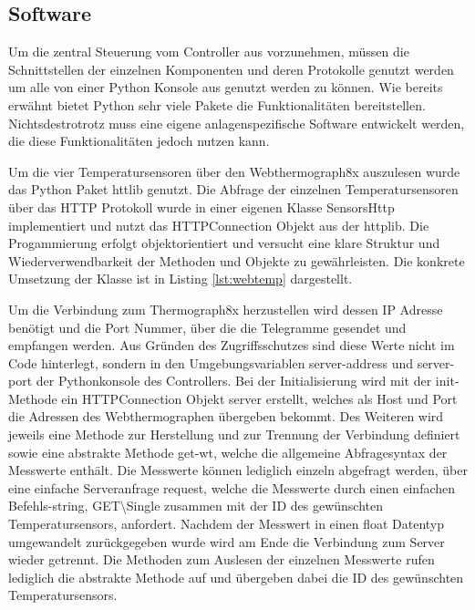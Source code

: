 \subsection{Software}

Um die zentral Steuerung vom Controller aus vorzunehmen, müssen die Schnittstellen der einzelnen Komponenten und deren Protokolle genutzt werden um alle von einer Python Konsole aus genutzt werden zu können. Wie bereits erwähnt bietet Python sehr viele Pakete die Funktionalitäten bereitstellen. Nichtsdestrotrotz muss eine eigene anlagenspezifische Software entwickelt werden, die diese Funktionalitäten jedoch nutzen kann.

Um die vier Temperatursensoren über den Webthermograph8x auszulesen wurde das Python Paket httlib genutzt. Die Abfrage der einzelnen Temperatursensoren über das HTTP Protokoll wurde in einer eigenen Klasse SensorsHttp implementiert und nutzt das HTTPConnection Objekt aus der httplib. Die Progammierung erfolgt objektorientiert und versucht eine klare Struktur und Wiederverwendbarkeit der Methoden und Objekte zu gewährleisten. Die konkrete Umsetzung der Klasse ist in Listing \ref{lst:webtemp} dargestellt.

Um die Verbindung zum Thermograph8x herzustellen wird dessen IP Adresse benötigt und die Port Nummer, über die die Telegramme gesendet und empfangen werden. Aus Gründen des Zugriffsschutzes sind diese Werte nicht im Code hinterlegt, sondern in den Umgebungsvariablen server-address und server-port der Pythonkonsole des Controllers.
Bei der Initialisierung wird mit der init-Methode ein HTTPConnection Objekt server erstellt, welches als Host und Port die Adressen des Webthermographen übergeben bekommt.
Des Weiteren wird jeweils eine Methode zur Herstellung und zur Trennung der Verbindung definiert sowie eine abstrakte Methode get-wt, welche die allgemeine Abfragesyntax der Messwerte enthält. Die Messwerte können lediglich einzeln abgefragt werden, über eine einfache Serveranfrage request, welche die Messwerte durch einen einfachen Befehls-string, \Gun GET\textbackslash Single \Gob zusammen mit der ID des gewünschten Temperatursensors, anfordert. Nachdem der Messwert in einen float Datentyp umgewandelt zurückgegeben wurde wird am Ende die Verbindung zum Server wieder getrennt. Die Methoden zum Auslesen der einzelnen Messwerte rufen lediglich die abstrakte Methode auf und übergeben dabei die ID des gewünschten Temperatursensors.













